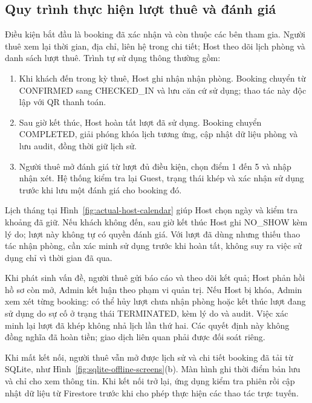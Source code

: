 \Needspace{0.55\textheight}
\subsection{Quy trình thực hiện lượt thuê và đánh giá}
Điều kiện bắt đầu là booking đã xác nhận và còn thuộc các bên tham gia. Người thuê xem lại thời gian, địa chỉ, liên hệ trong chi tiết; Host theo dõi lịch phòng và danh sách lượt thuê. Trình tự sử dụng thông thường gồm:
\begin{enumerate}
\item Khi khách đến trong kỳ thuê, Host ghi nhận nhận phòng. Booking chuyển từ CONFIRMED sang CHECKED\_IN và lưu căn cứ sử dụng; thao tác này độc lập với QR thanh toán.
\item Sau giờ kết thúc, Host hoàn tất lượt đã sử dụng. Booking chuyển COMPLETED, giải phóng khóa lịch tương ứng, cập nhật dữ liệu phòng và lưu audit, đồng thời giữ lịch sử.
\item Người thuê mở đánh giá từ lượt đủ điều kiện, chọn điểm 1 đến 5 và nhập nhận xét. Hệ thống kiểm tra lại Guest, trạng thái khép và xác nhận sử dụng trước khi lưu một đánh giá cho booking đó.
\end{enumerate}

Lịch tháng tại Hình~\ref{fig:actual-host-calendar} giúp Host chọn ngày và kiểm tra khoảng đã giữ. Nếu khách không đến, sau giờ kết thúc Host ghi NO\_SHOW kèm lý do; lượt này không tự có quyền đánh giá. Với lượt đã dùng nhưng thiếu thao tác nhận phòng, cần xác minh sử dụng trước khi hoàn tất, không suy ra việc sử dụng chỉ vì thời gian đã qua.

Khi phát sinh vấn đề, người thuê gửi báo cáo và theo dõi kết quả; Host phản hồi hồ sơ còn mở, Admin kết luận theo phạm vi quản trị. Nếu Host bị khóa, Admin xem xét từng booking: có thể hủy lượt chưa nhận phòng hoặc kết thúc lượt đang sử dụng do sự cố ở trạng thái TERMINATED, kèm lý do và audit. Việc xác minh lại lượt đã khép không nhả lịch lần thứ hai. Các quyết định này không đồng nghĩa đã hoàn tiền; giao dịch liên quan phải được đối soát riêng.

Khi mất kết nối, người thuê vẫn mở được lịch sử và chi tiết booking đã tải từ SQLite, như Hình~\ref{fig:sqlite-offline-screens}(b). Màn hình ghi thời điểm bản lưu và chỉ cho xem thông tin. Khi kết nối trở lại, ứng dụng kiểm tra phiên rồi cập nhật dữ liệu từ Firestore trước khi cho phép thực hiện các thao tác trực tuyến.
